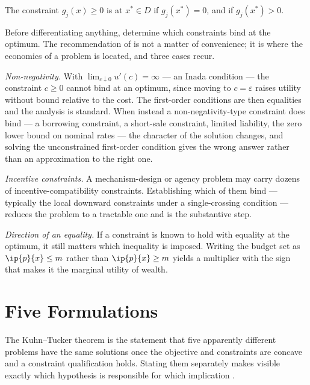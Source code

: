 \begin{definition}\label{def:binding}
	The constraint $g_j(x)\geq0$ is  at
	$x^\ast\in D$ if $g_j(x^\ast)=0$, and  if
	$g_j(x^\ast)>0$.
\end{definition}

\begin{remark}\label{rem:which-bind}
	Before differentiating anything, determine which constraints bind at the
	optimum. The recommendation of \autocite[slides 6--9]{fukuda2026optimization} is
	not a matter of convenience; it is where the economics of a problem is located,
	and three cases recur.

	\emph{Non-negativity.} With $\lim_{c\downarrow0}u'(c)=\infty$ --- an Inada
	condition --- the constraint $c\geq0$ cannot bind at an optimum, since moving to
	$c=\varepsilon$ raises utility without bound relative to the cost. The
	first-order conditions are then equalities and the analysis is standard. When
	instead a non-negativity-type constraint does bind --- a borrowing constraint, a
	short-sale constraint, limited liability, the zero lower bound on nominal rates
	--- the character of the solution changes, and solving the unconstrained
	first-order condition gives the wrong answer rather than an approximation to the
	right one.

	\emph{Incentive constraints.} A mechanism-design or agency problem may carry
	dozens of incentive-compatibility constraints. Establishing which of them bind
	--- typically the local downward constraints under a single-crossing condition
	--- reduces the problem to a tractable one and is the substantive step.

	\emph{Direction of an equality.} If a constraint is known to hold with equality
	at the optimum, it still matters which inequality is imposed. Writing the budget
	set as $\ip{p}{x}\leq m$ rather than $\ip{p}{x}\geq m$ yields a multiplier with
	the sign that makes it the marginal utility of wealth.
\end{remark}

\section{Five Formulations}\label{sec:opt-five}

The Kuhn--Tucker theorem is the statement that five apparently different
problems have the same solutions once the objective and constraints are concave
and a constraint qualification holds. Stating them
separately makes visible exactly which hypothesis is responsible for which
implication \autocite[slides 10--20]{fukuda2026optimization}.

